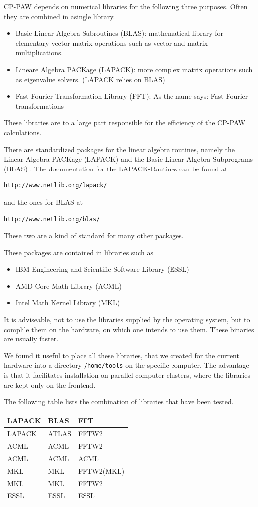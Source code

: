 \documentclass[a4paper,10pt]{report}
\newcommand{\mytt}[1]{{\tt #1}}
\begin{document}
CP-PAW depends on numerical libraries for the following three
purposes. Often they are combined in asingle library.
\begin{itemize}
\item Basic Linear Algebra Subroutines (BLAS):
mathematical library for elementary vector-matrix operations such as
vector and matrix multiplications.
\item Lineare Algebra PACKage (LAPACK): more complex
matrix operations such as eigenvalue solvers. (LAPACK relies on BLAS)
\item Fast Fourier Transformation Library (FFT):
As the name says: Fast Fourier transformations
\end{itemize}
These libraries are to a large part responsible for the efficiency of
the CP-PAW calculations.

There are standardized packages for the linear algebra routines,
namely the Linear Algebra PACKage (LAPACK) and the Basic Linear
Algebra Subprograms (BLAS) . The documentation for the LAPACK-Routines
can be found at
\begin{verbatim}
http://www.netlib.org/lapack/ 
\end{verbatim}
and the ones for BLAS at
\begin{verbatim}
http://www.netlib.org/blas/
\end{verbatim}
These two are a kind of standard for many other packages.

These packages are contained in libraries
such as
\begin{itemize}
\item IBM Engineering and Scientific Software Library (ESSL)
\item AMD Core Math Library (ACML)
\item Intel Math Kernel Library (MKL)
\end{itemize}

It is adviseable, not to use the libraries supplied by the operating system, but to complile them 
on the hardware, on which one intends to use them. These binaries are usually faster.

We found it useful to place all these libraries, that we created for
the current hardware into a directory \mytt{/home/tools} on the
specific computer. The advantage is that it facilitates installation
on parallel computer clusters, where the libraries are kept only on the
frontend.


The following table lists the combination of libraries that have been
tested.
\begin{center}
\begin{tabular}{|l|l|l|}
\hline
LAPACK& BLAS & FFT\\
\hline
LAPACK & ATLAS & FFTW2\\
ACML & ACML & FFTW2\\
ACML & ACML & ACML\\
MKL & MKL & FFTW2(MKL)\\
MKL & MKL & FFTW2\\
ESSL & ESSL & ESSL\\
\hline
\end{tabular}
\end{center}
\end{document}
